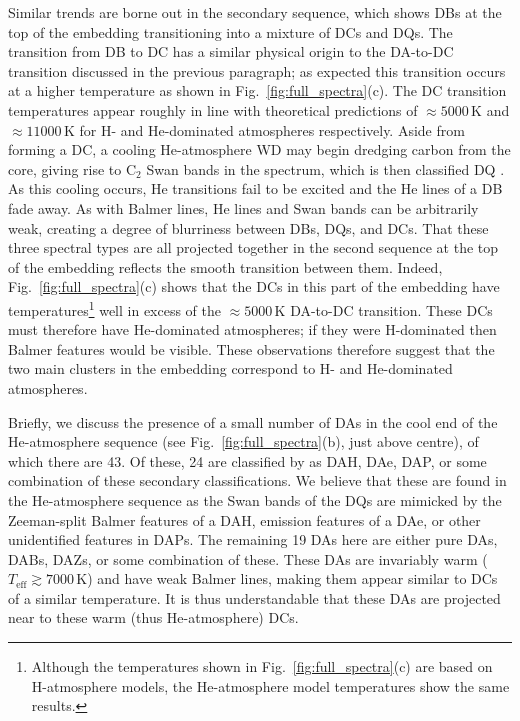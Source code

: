 \documentclass[fleqn,usenatbib]{mnras}
\def\Teff{T_\mathrm{eff}}
\begin{document}
Similar trends are borne out in the secondary sequence, which shows DBs at the top of the embedding transitioning into a mixture of DCs and DQs.
The transition from DB to DC has a similar physical origin to the DA-to-DC transition discussed in the previous paragraph; as expected this transition occurs at a higher temperature as shown in Fig.~\ref{fig:full_spectra}(c).
The DC transition temperatures appear roughly in line with theoretical predictions of $\approx 5000\,\text{K}$ and $\approx 11000\,\text{K}$ for H- and He-dominated atmospheres respectively.
Aside from forming a DC, a cooling He-atmosphere WD may begin dredging carbon from the core, giving rise to C$_2$ Swan bands in the spectrum, which is then classified DQ \citep{fontaine84}.
As this cooling occurs, He transitions fail to be excited and the He lines of a DB fade away.
As with Balmer lines, He lines and Swan bands can be arbitrarily weak, creating a degree of blurriness between DBs, DQs, and DCs.
That these three spectral types are all projected together in the second sequence at the top of the embedding reflects the smooth transition between them.
Indeed, Fig.~\ref{fig:full_spectra}(c) shows that the DCs in this part of the embedding have temperatures\footnote{
    Although the temperatures shown in Fig.~\ref{fig:full_spectra}(c) are based on H-atmosphere models, the He-atmosphere model temperatures show the same results.
} well in excess of the $\approx 5000\,\text{K}$ DA-to-DC transition.
These DCs must therefore have He-dominated atmospheres; if they were H-dominated then Balmer features would be visible.
These observations therefore suggest that the two main clusters in the embedding correspond to H- and He-dominated atmospheres.

Briefly, we discuss the presence of a small number of DAs in the cool end of the He-atmosphere sequence (see Fig.~\ref{fig:full_spectra}(b), just above centre), of which there are 43.
Of these, 24 are classified by \citet{manser24} as DAH, DAe, DAP, or some combination of these secondary classifications.
We believe that these are found in the He-atmosphere sequence as the Swan bands of the DQs are mimicked by the Zeeman-split Balmer features of a DAH, emission features of a DAe, or other unidentified features in DAPs.
The remaining 19 DAs here are either pure DAs, DABs, DAZs, or some combination of these.
These DAs are invariably warm ($\Teff \gtrsim 7000\,\text{K}$) and have weak Balmer lines, making them appear similar to DCs of a similar temperature.
It is thus understandable that these DAs are projected near to these warm (thus He-atmosphere) DCs.
\end{document}
